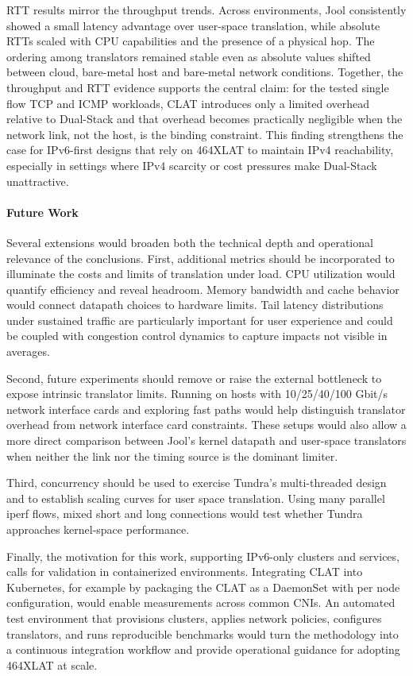 RTT results mirror the throughput trends. Across environments, Jool consistently showed a small latency advantage over user-space translation, while absolute RTTs scaled with CPU capabilities and the presence of a physical hop. The ordering among translators remained stable even as absolute values shifted between cloud, bare-metal host and bare-metal network conditions. Together, the throughput and RTT evidence supports the central claim: for the tested single flow TCP and ICMP workloads, CLAT introduces only a limited overhead relative to Dual-Stack and that overhead becomes practically negligible when the network link, not the host, is the binding constraint. This finding strengthens the case for IPv6-first designs that rely on 464XLAT to maintain IPv4 reachability, especially in settings where IPv4 scarcity or cost pressures make Dual-Stack unattractive.

\paragraph{Future Work}

Several extensions would broaden both the technical depth and operational relevance of the conclusions. First, additional metrics should be incorporated to illuminate the costs and limits of translation under load. CPU utilization would quantify efficiency and reveal headroom. Memory bandwidth and cache behavior would connect datapath choices to hardware limits. Tail latency distributions under sustained traffic are particularly important for user experience and could be coupled with congestion control dynamics to capture impacts not visible in averages. 

Second, future experiments should remove or raise the external bottleneck to expose intrinsic translator limits. Running on hosts with 10/25/40/100 Gbit/s network interface cards and exploring fast paths would help distinguish translator overhead from network interface card constraints. These setups would also allow a more direct comparison between Jool’s kernel datapath and user-space translators when neither the link nor the timing source is the dominant limiter.

Third, concurrency should be used to exercise Tundra’s multi-threaded design and to establish scaling curves for user space translation. Using many parallel iperf flows, mixed short and long connections would test whether Tundra approaches kernel-space performance. 

Finally, the motivation for this work, supporting IPv6-only clusters and services, calls for validation in containerized environments. Integrating CLAT into Kubernetes, for example by packaging the CLAT as a DaemonSet with per node configuration, would enable measurements across common CNIs. An automated test environment that provisions clusters, applies network policies, configures translators, and runs reproducible benchmarks would turn the methodology into a continuous integration workflow and provide operational guidance for adopting 464XLAT at scale.
